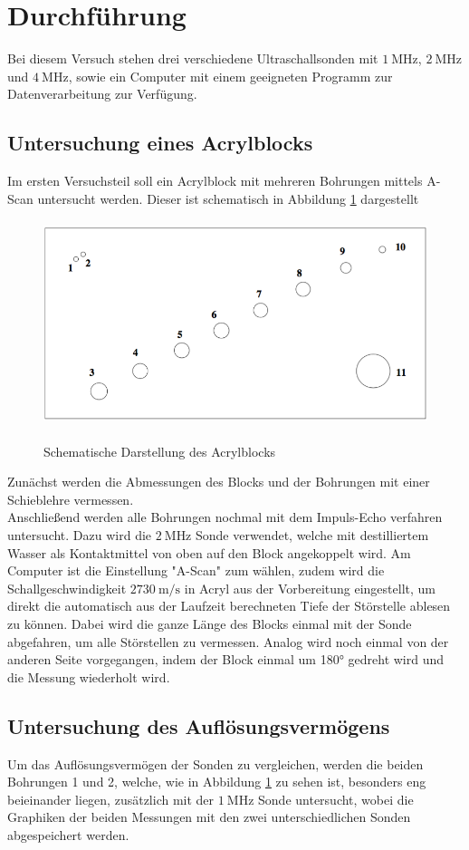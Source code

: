 \section{Durchführung}
\label{sec:Durchführung}
Bei diesem Versuch stehen drei verschiedene Ultraschallsonden mit $\SI{1}{\mega\hertz}$,
$\SI{2}{\mega\hertz}$ und $\SI{4}{\mega\hertz}$, sowie ein Computer mit einem geeigneten
Programm zur Datenverarbeitung zur Verfügung.

\subsection{Untersuchung eines Acrylblocks}
Im ersten Versuchsteil soll ein Acrylblock mit mehreren Bohrungen mittels
A-Scan untersucht werden. Dieser ist schematisch in Abbildung \ref{fig:block}
dargestellt
\begin{figure}[H]
  \centering
  \includegraphics[height=6cm]{block.png}
  \caption{Schematische Darstellung des Acrylblocks}
  \label{fig:block}
  \cite{skript}
\end{figure}
Zunächst werden die Abmessungen des Blocks und der Bohrungen mit einer Schieblehre
vermessen. \\
Anschließend werden alle Bohrungen nochmal mit dem Impuls-Echo verfahren untersucht.
Dazu wird die $\SI{2}{\mega\hertz}$ Sonde verwendet, welche mit destilliertem Wasser
als Kontaktmittel von oben auf den Block angekoppelt wird. Am Computer ist die Einstellung
"A-Scan" zum wählen, zudem wird die Schallgeschwindigkeit $\SI{2730}{\meter\per\second}$
in Acryl aus der Vorbereitung eingestellt, um direkt die automatisch aus der Laufzeit berechneten
Tiefe der Störstelle ablesen zu können. Dabei wird die ganze Länge des Blocks einmal
mit der Sonde abgefahren, um alle Störstellen zu vermessen.
Analog wird noch einmal von der anderen Seite vorgegangen, indem der Block einmal
um 180° gedreht wird und die Messung wiederholt wird.

\subsection{Untersuchung des Auflösungsvermögens}
Um das Auflösungsvermögen der Sonden zu vergleichen, werden die beiden Bohrungen 1 und 2,
welche, wie in Abbildung \ref{fig:block} zu sehen ist, besonders eng beieinander liegen,
zusätzlich mit der $\SI{1}{\mega\hertz}$ Sonde untersucht, wobei die Graphiken
der beiden Messungen mit den zwei unterschiedlichen Sonden abgespeichert werden.

